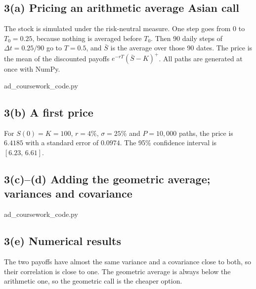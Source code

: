 \documentclass[11pt,a4paper]{article}
\newcommand{\code}[2]{%
  
  {ad_coursework_code.py}}
\newcommand{\restab}[3]{%
  \begin{table}[H]\centering\footnotesize
  \caption{#2}\label{#3}
  
  \end{table}}
\begin{document}
\subsection*{3(a) Pricing an arithmetic average Asian call}
The stock is simulated under the risk-neutral measure. One step goes from
$0$ to $T_0=0.25$, because nothing is averaged before $T_0$. Then 90 daily
steps of $\Delta t=0.25/90$ go to $T=0.5$, and $\bar S$ is the average over
those 90 dates. The price is the mean of the discounted payoffs
$e^{-rT}(\bar S-K)^+$. All paths are generated at once with NumPy.
\code{asianpaths}{Path simulation and arithmetic Asian call pricer.}

\subsection*{3(b) A first price}
For $S(0)=K=100$, $r=4\%$, $\sigma=25\%$ and $P=10{,}000$ paths, the price
is $\mathbf{6.4185}$ with a standard error of $0.0974$. The 95\% confidence
interval is $[6.23,\,6.61]$.

\subsection*{3(c)--(d) Adding the geometric average; variances and covariance}
\code{asianfull}{Arithmetic and geometric Asian calls on the same paths;
returns the five requested numbers.}

\subsection*{3(e) Numerical results}
\restab{q3_results}{$S(0)=K=100$, $r=5\%$, $q=1\%$, $\sigma=30\%$, $T=0.5$,
$T_0=0.25$, 90 days, $P=5{,}000$. Variances and covariance are per path
for the discounted payoffs.}{tab:q3-results}
The two payoffs have almost the same variance and a covariance close to
both, so their correlation is close to one. The geometric average is always
below the arithmetic one, so the geometric call is the cheaper option.
\end{document}
